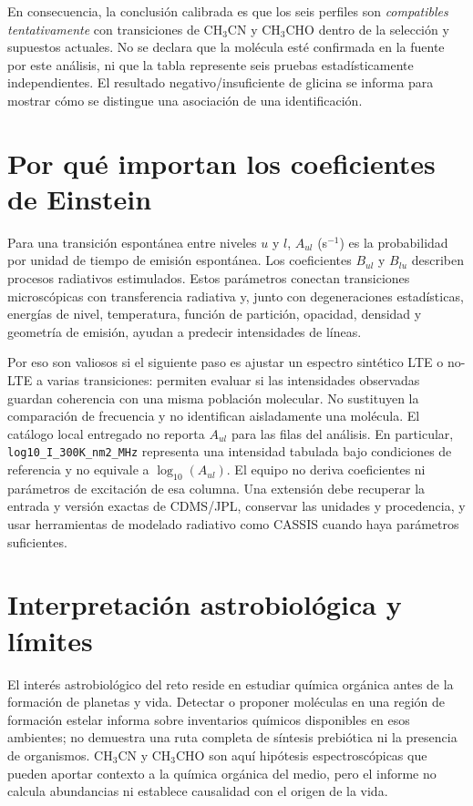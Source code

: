 \documentclass[10pt]{article}
\begin{document}
En consecuencia, la conclusión calibrada es que los seis perfiles son \emph{compatibles tentativamente} con transiciones de CH$_3$CN y CH$_3$CHO dentro de la selección y supuestos actuales. No se declara que la molécula esté confirmada en la fuente por este análisis, ni que la tabla represente seis pruebas estadísticamente independientes. El resultado negativo/insuficiente de glicina se informa para mostrar cómo se distingue una asociación de una identificación.

\section{Por qué importan los coeficientes de Einstein}
Para una transición espontánea entre niveles $u$ y $l$, $A_{ul}$ (s$^{-1}$) es la probabilidad por unidad de tiempo de emisión espontánea. Los coeficientes $B_{ul}$ y $B_{lu}$ describen procesos radiativos estimulados. Estos parámetros conectan transiciones microscópicas con transferencia radiativa y, junto con degeneraciones estadísticas, energías de nivel, temperatura, función de partición, opacidad, densidad y geometría de emisión, ayudan a predecir intensidades de líneas.

Por eso son valiosos si el siguiente paso es ajustar un espectro sintético LTE o no-LTE a varias transiciones: permiten evaluar si las intensidades observadas guardan coherencia con una misma población molecular. No sustituyen la comparación de frecuencia y no identifican aisladamente una molécula. El catálogo local entregado no reporta $A_{ul}$ para las filas del análisis. En particular, \texttt{log10\_I\_300K\_nm2\_MHz} representa una intensidad tabulada bajo condiciones de referencia y no equivale a $\log_{10}(A_{ul})$. El equipo no deriva coeficientes ni parámetros de excitación de esa columna. Una extensión debe recuperar la entrada y versión exactas de CDMS/JPL, conservar las unidades y procedencia, y usar herramientas de modelado radiativo como CASSIS cuando haya parámetros suficientes.

\section{Interpretación astrobiológica y límites}
El interés astrobiológico del reto reside en estudiar química orgánica antes de la formación de planetas y vida. Detectar o proponer moléculas en una región de formación estelar informa sobre inventarios químicos disponibles en esos ambientes; no demuestra una ruta completa de síntesis prebiótica ni la presencia de organismos. CH$_3$CN y CH$_3$CHO son aquí hipótesis espectroscópicas que pueden aportar contexto a la química orgánica del medio, pero el informe no calcula abundancias ni establece causalidad con el origen de la vida.
\end{document}
